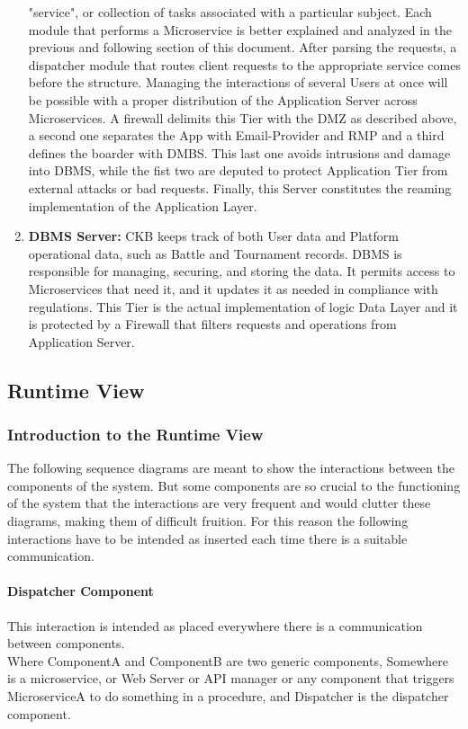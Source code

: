 \begin{enumerate}[label=$\bullet$]
    "service", or collection of tasks associated with a particular subject. Each module that performs a Microservice is better explained and analyzed in the previous and following section of this document. After parsing the requests, a dispatcher module that routes client requests to the appropriate service comes before the structure. Managing the interactions of several Users at once 
    will be possible with a proper distribution of the Application Server across Microservices. A firewall delimits this Tier with the DMZ as described above, a second one separates the App with Email-Provider and RMP and a third defines the boarder with DMBS.
    This last one avoids intrusions and damage into DBMS, while the fist two are deputed to protect Application Tier from external attacks or bad requests. Finally, this Server constitutes the reaming implementation of the Application Layer.
    \item \textbf{DBMS Server:} CKB keeps track of both User data and Platform operational data, such as Battle and Tournament records. DBMS is responsible for managing, securing, and storing the data. It permits access to 
    Microservices that need it, and it updates it as needed in compliance with regulations. This Tier is the actual implementation of logic Data Layer and it is protected by a Firewall that filters requests and operations from Application Server. 
\end{enumerate}
\clearpage
\subsection{Runtime View}
\subsubsection{Introduction to the Runtime View}
The following sequence diagrams are meant to show the interactions between the components of the system.
But some components are so crucial to the functioning of the system that the interactions are very frequent and would clutter these diagrams, making them of difficult fruition.
For this reason the following interactions have to be intended as inserted each time there is a suitable communication.
\paragraph*{Dispatcher Component} \label{parr:dispatcher}
This interaction is intended as placed everywhere there is a communication between components.\\
Where ComponentA and ComponentB are two generic components, Somewhere is a microservice, or Web Server or API manager or any component that triggers MicroserviceA to do something in a procedure, and Dispatcher is the dispatcher component.
